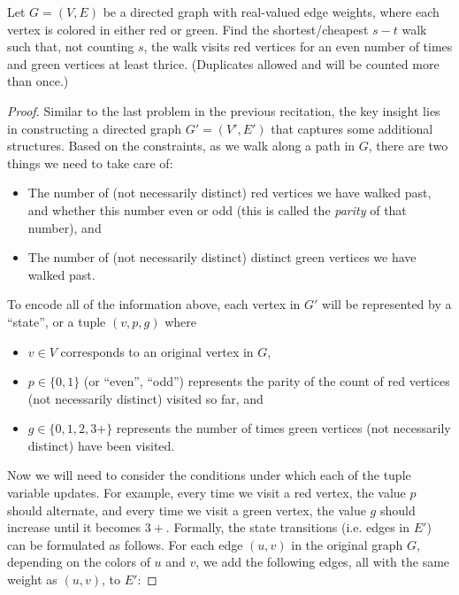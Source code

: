   \begin{exercise}
    Let $G=(V,E)$ be a directed graph with real-valued edge weights, where each vertex is colored in either {\color{red} red} or {\color{dkgreen} green}. Find the shortest/cheapest $s-t$ walk such that, not counting $s$, the walk visits red vertices for an even number of times and green vertices at least thrice. (Duplicates allowed and will be counted more than once.)
  \end{exercise}
  \begin{proof}
    Similar to the last problem in the previous recitation, the key insight lies in constructing a directed graph $G'=(V', E')$ that captures some additional structures. Based on the constraints, as we walk along a path in $G$, there are two things we need to take care of: 
    \begin{itemize}
      \item The number of (not necessarily distinct) red vertices we have walked past, and whether this number even or odd (this is called the \textit{parity} of that number), and
      \item The number of (not necessarily distinct) distinct green vertices we have walked past. 
    \end{itemize}
    To encode all of the information above, each vertex in $G'$ will be represented by a ``state'', or a tuple $(v, p, g)$ where
    \begin{itemize}
      \item $v\in V$ corresponds to an original vertex in $G$,
      \item $p\in \{0,1\}$ (or ``even'', ``odd'') represents the parity of the count of red vertices (not necessarily distinct) visited so far, and
      \item $g \in \{0,1,2,3+\}$ represents the number of times green vertices (not necessarily distinct) have been visited.
    \end{itemize}

    Now we will need to consider the conditions under which each of the tuple variable updates. For example, every time we visit a red vertex, the value $p$ should alternate, and every time we visit a green vertex, the value $g$ should increase until it becomes $3+$. Formally, the state transitions (i.e. edges in $E'$) can be formulated as follows. For each edge $(u,v)$ in the original graph $G$, depending on the colors of $u$ and $v$, we add the following edges, all with the same weight as $(u,v)$, to $E'$:


\end{proof}
